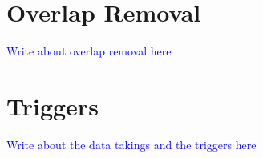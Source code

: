 \section{Overlap Removal}
\textcolor{blue}{Write about overlap removal here}

\section{Triggers}
\textcolor{blue}{Write about the data takings and the triggers here}


